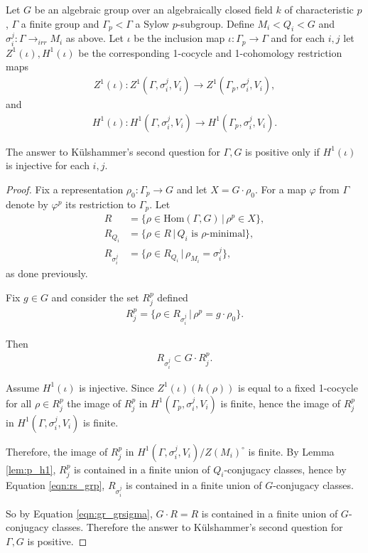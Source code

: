 \begin{theorem}
  Let $G$ be an algebraic group over an algebraically closed field $k$ of characteristic $p$, $\Gamma$ a finite group and $\Gamma_p < \Gamma$ a Sylow $p$-subgroup. Define $M_i < Q_i < G$ and $\sigma_i^{j}:\Gamma \rightarrow_{irr} M_{i}$ as above. Let $\iota$ be the inclusion map $\iota : \Gamma_p \rightarrow \Gamma$ and for each $i,j$ let $Z^1(\iota), H^1(\iota)$ be the corresponding 1-cocycle and 1-cohomology restriction maps
  \begin{align*}
    Z^1(\iota) : Z^1(\Gamma, \sigma_i^j, V_i) \rightarrow Z^1(\Gamma_p, \sigma_i^j, V_i),
  \end{align*}
  and
  \begin{align*}
    H^1(\iota) : H^1(\Gamma, \sigma_i^j, V_i) \rightarrow H^1(\Gamma_p, \sigma_i^j, V_i).
  \end{align*}
  
  The answer to K\"ulshammer's second question for $\Gamma, G$ is positive only if $H^1(\iota)$ is injective for each $i,j$.
  \label{thm:k2_h1}
\end{theorem}
\begin{proof}
  Fix a representation $\rho_0: \Gamma_p \rightarrow G$ and let $X = G \cdot \rho_0$. For a map $\varphi$ from $\Gamma$ denote by $\varphi^p$ its restriction to $\Gamma_p$. Let
  \begin{align*}
    R &=  \{ \rho \in \textrm{Hom}(\Gamma, G) \,|\, \rho^p \in X\}, \\
    R_{Q_i} &=  \{ \rho \in R \,|\, Q_i \textrm{ is } \rho \textrm{-minimal} \}, \\
    R_{\sigma_i^j} &=  \{ \rho \in R_{Q_i} \,|\, \rho_{M_i} = \sigma_i^j \},
  \end{align*}
  as done previously.
  
  Fix $g \in G$ and consider the set $R_j^p$ defined
  \begin{align*}
    R_j^p = \{ \rho \in R_{\sigma_i^j} \,|\, \rho^p = g \cdot \rho_0 \}.
  \end{align*}

  Then
  \begin{align}
    R_{\sigma_i^j} \subset G \cdot R_j^p.
    \label{eqn:rs_grp}
  \end{align}

  Assume $H^1(\iota)$ is injective. Since $Z^1(\iota)(h(\rho))$ is equal to a fixed 1-cocycle for all $\rho \in R_j^p$ the image of $R_j^p$ in $H^1(\Gamma_p, \sigma_i^j, V_i)$ is finite, hence the image of $R_j^p$ in $H^1(\Gamma, \sigma_i^j, V_i)$ is finite. 
  
  Therefore, the image of $R_j^p$ in $H^1(\Gamma, \sigma_i^j, V_i)/Z(M_i)^\circ$ is finite. By Lemma \ref{lem:p_h1}, $R_j^p$ is contained in a finite union of $Q_i$-conjugacy classes, hence by Equation \ref{eqn:rs_grp}, $R_{\sigma_i^j}$ is contained in a finite union of $G$-conjugacy classes.

  So by Equation \ref{eqn:gr_grsigma}, $G \cdot R = R$ is contained in a finite union of $G$-conjugacy classes. Therefore the answer to K\"ulshammer's second question for $\Gamma, G$ is positive.
\end{proof}

